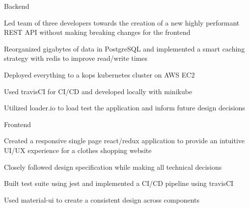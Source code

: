 
\begin{cventries}
  \cventry
    {} %
    {Backend} %
    {} %
    {} %
    {
      \begin{cvitems} %
        \item {Led team of three developers towards the creation of a new highly performant REST API without making breaking changes for the frontend}
		\item {Reorganized gigabytes of data in PostgreSQL and implemented a smart caching strategy with redis to improve read/write times}
		\item {Deployed everything to a kops kubernetes cluster on AWS EC2}
    \item {Used travisCI for CI/CD and developed locally with minikube}
    \item {Utilized loader.io to load test the application and inform future design decisions}
      \end{cvitems}
    }
  
  \cventry
    {} %
    {Frontend} %
    {} %
    {} %
    {
      \begin{cvitems} %
		\item {Created a responsive single page react/redux application to provide an intuitive UI/UX experience for a clothes shopping website}
		\item {Closely followed design specification while making all technical decisions}
		\item {Built test suite using jest and implemented a CI/CD pipeline using travisCI}
		\item {Used material-ui to create a consistent design across components}
      \end{cvitems}
    }

    

\end{cventries}
